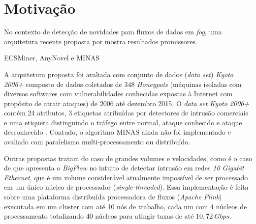 \section{Motivação}\label{sec:motivo}

No contexto de detecção de novidades para fluxos de dados em \emph{fog}, uma
arquitetura recente proposta por  mostra resultados promissores.

ECSMiner, AnyNovel e MINAS


A arquitetura proposta foi avaliada com conjunto de dados (\emph{data set}) \emph{Kyoto 2006+} 
composto de dados coletados de 348 \emph{Honeypots} (máquinas isoladas com diversos softwares
com vulnerabilidades conhecidas expostas à Internet com propósito de atrair
ataques) de 2006 até dezembro 2015.
O \emph{data set} \emph{Kyoto 2006+} contém 24 atributos, 3 etiquetas atribuídas por
detectores de intrusão comerciais e uma etiqueta
distinguindo o tráfego entre normal, ataque conhecido e ataque desconhecido
\cite{Cassales2019a}.
Contudo, o algoritmo MINAS ainda não foi implementado e avaliado com paralelismo
multi-processamento ou distribuído.

Outras propostas tratam do caso de grandes volumes e velocidades, como é o caso
de  que apresenta o \emph{BigFlow} no intuito de detectar
intrusão em redes \emph{10 Gigabit Ethernet}, que é um volume considerável
atualmente impossível de ser processado em um único núcleo de processador
(\emph{single-threaded}). Essa implementação é feita sobre uma plataforma
distribuída processadora de fluxos (\emph{Apache Flink}) executada em um cluster
com até 10 nós de trabalho, cada um com 4 núcleos de processamento totalizando
40 núcleos para atingir taxas de até $10,72 \ Gbps$.


